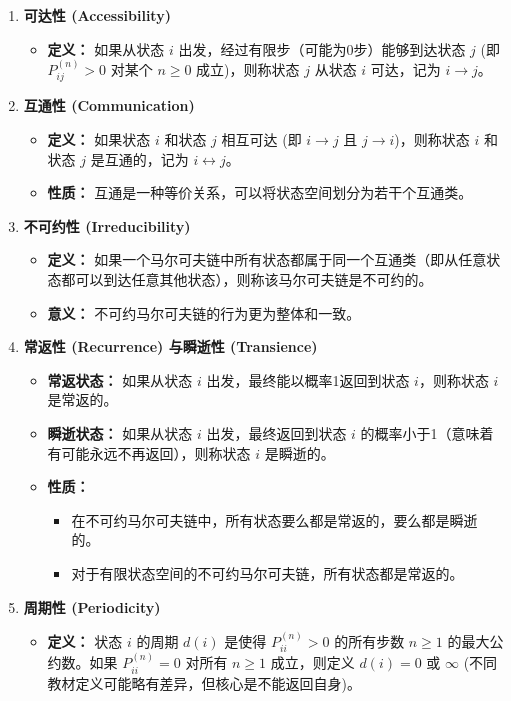 \begin{enumerate}
	\item \textbf{可达性 (Accessibility)}
	\begin{itemize}
		\item \textbf{定义：} 如果从状态 $i$ 出发，经过有限步（可能为0步）能够到达状态 $j$ (即 $P_{ij}^{(n)} > 0$ 对某个 $n \ge 0$ 成立)，则称状态 $j$ 从状态 $i$ 可达，记为 $i \to j$。
	\end{itemize}
	\item \textbf{互通性 (Communication)}
	\begin{itemize}
		\item \textbf{定义：} 如果状态 $i$ 和状态 $j$ 相互可达 (即 $i \to j$ 且 $j \to i$)，则称状态 $i$ 和状态 $j$ 是互通的，记为 $i \leftrightarrow j$。
		\item \textbf{性质：} 互通是一种等价关系，可以将状态空间划分为若干个互通类。
	\end{itemize}
	\item \textbf{不可约性 (Irreducibility)}
	\begin{itemize}
		\item \textbf{定义：} 如果一个马尔可夫链中所有状态都属于同一个互通类（即从任意状态都可以到达任意其他状态），则称该马尔可夫链是不可约的。
		\item \textbf{意义：} 不可约马尔可夫链的行为更为整体和一致。
	\end{itemize}
	\item \textbf{常返性 (Recurrence) 与瞬逝性 (Transience)}
	\begin{itemize}
		\item \textbf{常返状态：} 如果从状态 $i$ 出发，最终能以概率1返回到状态 $i$，则称状态 $i$ 是常返的。
		\item \textbf{瞬逝状态：} 如果从状态 $i$ 出发，最终返回到状态 $i$ 的概率小于1（意味着有可能永远不再返回），则称状态 $i$ 是瞬逝的。
		\item \textbf{性质：}
		\begin{itemize}
			\item 在不可约马尔可夫链中，所有状态要么都是常返的，要么都是瞬逝的。
			\item 对于有限状态空间的不可约马尔可夫链，所有状态都是常返的。
		\end{itemize}
	\end{itemize}
	\item \textbf{周期性 (Periodicity)}
	\begin{itemize}
		\item \textbf{定义：} 状态 $i$ 的周期 $d(i)$ 是使得 $P_{ii}^{(n)} > 0$ 的所有步数 $n \ge 1$ 的最大公约数。如果 $P_{ii}^{(n)} = 0$ 对所有 $n \ge 1$ 成立，则定义 $d(i) = 0$ 或 $\infty$ (不同教材定义可能略有差异，但核心是不能返回自身)。

\end{itemize}
\end{enumerate}
